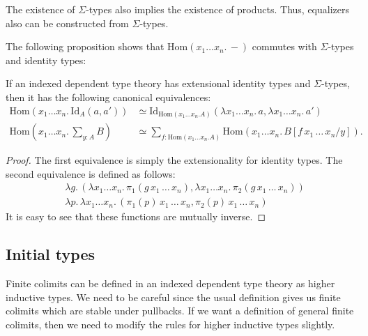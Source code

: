 \documentclass[reqno]{amsart}
\theoremstyle{definition}
\theoremstyle{remark}
\newcommand{\fs}[1]{\mathrm{#1}}
\newcommand{\Hom}{\fs{Hom}}
\newcommand{\Id}{\fs{Id}}
\numberwithin{figure}{section}
\begin{document}
\begin{remark}
The existence of $\Sigma$-types also implies the existence of products.
Thus, equalizers also can be constructed from $\Sigma$-types.
\end{remark}

The following proposition shows that $\Hom(x_1 \ldots x_n.\,-)$ commutes with $\Sigma$-types and identity types:
\begin{prop}
If an indexed dependent type theory has extensional identity types and $\Sigma$-types, then it has the following canonical equivalences:
\begin{align*}
\Hom(x_1 \ldots x_n.\,\Id_A(a,a')) & \simeq \Id_{\Hom(x_1 \ldots x_n. A)}(\lambda x_1 \ldots x_n.\,a, \lambda x_1 \ldots x_n.\,a') \\
\Hom(x_1 \ldots x_n.\,\sum_{y : A} B) & \simeq \sum_{f : \Hom(x_1 \ldots x_n. A)} \Hom(x_1 \ldots x_n.\,B[f\,x_1\,\ldots\,x_n / y]).
\end{align*}
\end{prop}
\begin{proof}
The first equivalence is simply the extensionality for identity types.
The second equivalence is defined as follows:
\begin{align*}
& \lambda g.\,(\lambda x_1 \ldots x_n.\,\pi_1(g\,x_1\,\ldots\,x_n), \lambda x_1 \ldots x_n.\,\pi_2(g\,x_1\,\ldots\,x_n)) \\
& \lambda p.\,\lambda x_1 \ldots x_n.\,(\pi_1(p)\,x_1\,\ldots\,x_n, \pi_2(p)\,x_1\,\ldots\,x_n)
\end{align*}
It is easy to see that these functions are mutually inverse.
\end{proof}

\subsection{Initial types}

Finite colimits can be defined in an indexed dependent type theory as higher inductive types.
We need to be careful since the usual definition gives us finite colimits which are stable under pullbacks.
If we want a definition of general finite colimits, then we need to modify the rules for higher inductive types slightly.
\end{document}
